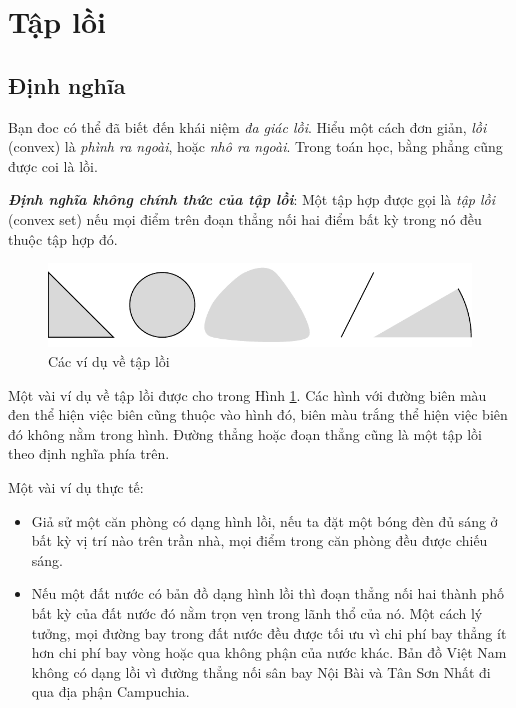 \section{Tập lồi}
\subsection{Định nghĩa}
Bạn đoc có thể đã biết đến khái niệm \textit{đa giác lồi}. Hiểu một cách đơn giản, \textit{lồi} (convex) là \textit{phình ra ngoài}, hoặc \textit{nhô ra ngoài}. Trong toán học,
{bằng phẳng} cũng được coi là {lồi}.
 
\textit{\textbf{Định nghĩa không chính thức của tập lồi}}: Một tập hợp được gọi là
\textit{tập lồi} (convex set) nếu mọi điểm trên đoạn thẳng nối hai điểm {bất kỳ} trong
nó đều thuộc tập hợp đó.


\begin{figure}[t]
\centering
    \includegraphics[width = .8\textwidth]{Chapters/08_ConvexOptimization/16_convexity/latex/convexsets.pdf}
    \caption[]{Các ví dụ về tập lồi}
    \label{fig:16_convexsets}
\end{figure}

Một vài ví dụ về tập lồi được cho trong Hình \ref{fig:16_convexsets}. Các hình
với đường biên màu đen thể hiện việc biên cũng thuộc vào hình đó, biên màu trắng
thể hiện việc biên đó không nằm trong hình. Đường thẳng hoặc đoạn
thẳng cũng là một tập lồi theo định nghĩa phía trên.
 
Một vài ví dụ thực tế: 

\begin{itemize}
    \item Giả sử một căn phòng có dạng hình lồi, nếu ta đặt một bóng đèn đủ
    sáng ở bất kỳ vị trí nào trên trần nhà, mọi điểm trong căn phòng đều được
    chiếu sáng.
 
    \item Nếu một đất nước có bản đồ dạng hình lồi thì đoạn thẳng nối hai
    thành phố bất kỳ của đất nước đó nằm trọn vẹn trong lãnh thổ của nó. Một cách lý
    tưởng, mọi đường bay trong đất nước đều được tối ưu vì chi phí bay thẳng ít
    hơn chi phí bay vòng hoặc qua không phận của nước khác. Bản đồ Việt
    Nam không có dạng lồi vì đường thẳng nối sân bay Nội Bài và Tân Sơn Nhất đi
    qua địa phận Campuchia. 

\end{itemize}
 
